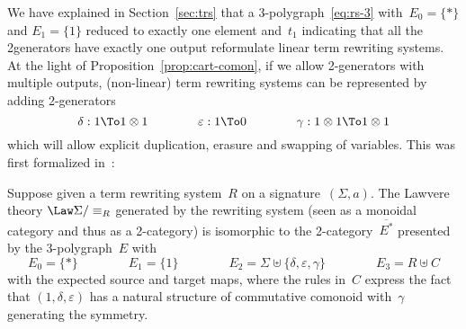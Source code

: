 \documentclass{LMCS}
\begin{document}
We have explained in Section~\ref{sec:trs} that a 3-polygraph~\eqref{eq:rs-3}
with~$E_0=\{*\}$ and \hbox{$E_1=\{1\}$} reduced to exactly one element and~$t_1$
indicating that all the 2\nbd{}generators have exactly one output reformulate
linear term rewriting systems. At the light of Proposition~\ref{prop:cart-comon},
if we allow 2-generators with multiple outputs, (non-linear) term rewriting
systems can be represented by adding 2-generators
\[
\delta:1\To 1\otimes 1
\qquad\qquad
\varepsilon:1\To 0
\qquad\qquad
\gamma:1\otimes 1\To 1\otimes 1
\]
which will allow explicit duplication, erasure and swapping of variables. This
was first formalized in~\cite{burroni:higher-word}:

\begin{prop}
  Suppose given a term rewriting system~$R$ on a signature~$(\Sigma,a)$. The
  Lawvere theory $\Law\Sigma/\equiv_R$ generated by the rewriting system (seen
  as a monoidal category and thus as a 2-category) is isomorphic to the
  2-category~$\overline{E^*}$ presented by the 3-polygraph~$E$ with
  \[
  E_0=\{*\}
  \qquad\qquad
  E_1=\{1\}
  \qquad\qquad
  E_2=\Sigma\uplus\{\delta,\varepsilon,\gamma\}
  \qquad\qquad
  E_3=R\uplus C
  \]
  with the expected source and target maps, where the rules in~$C$ express
  the fact that $(1,\delta,\varepsilon)$ has a natural structure of commutative
  comonoid with~$\gamma$ generating the symmetry.
\end{prop}
\end{document}
